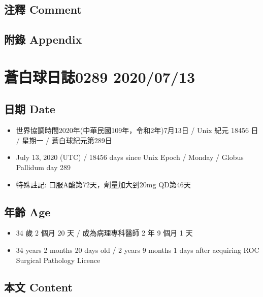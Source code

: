 \documentclass[a5paper, 11pt
]{book}
\providecommand{\tightlist}{%
  \setlength{\itemsep}{0pt}\setlength{\parskip}{0pt}}
\begin{document}
\hypertarget{ux6ce8ux91cb-comment-36}{%
\subsection{注釋 Comment}\label{ux6ce8ux91cb-comment-36}}

\hypertarget{ux9644ux9304-appendix-36}{%
\subsection{附錄 Appendix}\label{ux9644ux9304-appendix-36}}

\hypertarget{ux84bcux767dux7403ux65e5ux8a8c0289-20200713}{%
\section{蒼白球日誌0289
2020/07/13}\label{ux84bcux767dux7403ux65e5ux8a8c0289-20200713}}

\hypertarget{ux65e5ux671f-date-37}{%
\subsection{日期 Date}\label{ux65e5ux671f-date-37}}

\begin{itemize}
\tightlist
\item
  世界協調時間2020年(中華民國109年，令和2年)7月13日 / Unix 紀元 18456 日
  / 星期一 / 蒼白球紀元第289日
\item
  July 13, 2020 (UTC) / 18456 days since Unix Epoch / Monday / Globus
  Pallidum day 289
\item
  特殊註記: 口服A酸第72天，劑量加大到20mg QD第46天
\end{itemize}

\hypertarget{ux5e74ux9f61-age-37}{%
\subsection{年齡 Age}\label{ux5e74ux9f61-age-37}}

\begin{itemize}
\tightlist
\item
  34 歲 2 個月 20 天 / 成為病理專科醫師 2 年 9 個月 1 天
\item
  34 years 2 months 20 days old / 2 years 9 months 1 days after
  acquiring ROC Surgical Pathology Licence
\end{itemize}

\hypertarget{ux672cux6587-content-37}{%
\subsection{本文 Content}\label{ux672cux6587-content-37}}
\end{document}
